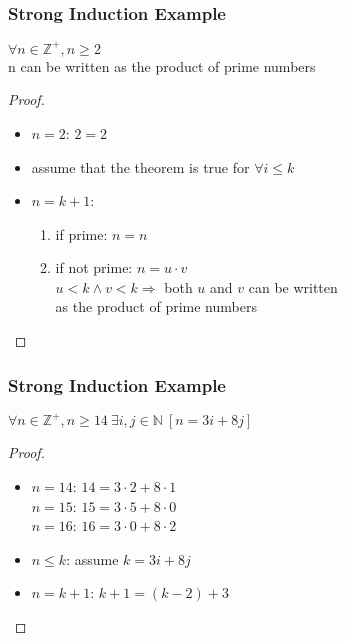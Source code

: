 \documentclass[dvipsnames]{beamer}
\begin{document}
\begin{frame}
  \frametitle{Strong Induction Example}

  \begin{theorem}
    $\forall n \in \mathbb{Z}^+, n \geq 2$\\
      n can be written as the product of prime numbers
  \end{theorem}

  \pause
  \begin{proof}
    \begin{itemize}
      \item $n=2$: $2=2$

      \pause
      \item assume that the theorem is true for $\forall i \leq k$

      \pause
      \item $n=k+1$:
      \begin{enumerate}
        \item if prime: $n=n$

        \pause
        \item if not prime: $n=u \cdot v$\\
          $u < k \wedge v < k \Rightarrow$ both $u$ and $v$ can be written\\
          as the product of prime numbers
      \end{enumerate}
    \end{itemize}
  \end{proof}
\end{frame}

\begin{frame}
  \frametitle{Strong Induction Example}

  \begin{theorem}
    $\forall n \in \mathbb{Z}^+, n \geq 14~\exists i,j \in \mathbb{N}~[n=3i+8j]$
  \end{theorem}

  \pause
  \begin{proof}
    \begin{itemize}
      \item $n=14$: $14=3 \cdot 2 + 8 \cdot 1$\\
        $n=15$: $15=3 \cdot 5 + 8 \cdot 0$\\
        $n=16$: $16=3 \cdot 0 + 8 \cdot 2$

      \pause
      \item $n \leq k$: assume $k=3i+8j$

      \pause
      \item $n=k+1$: $k+1=(k-2)+3$
    \end{itemize}
  \end{proof}
\end{frame}
\end{document}
